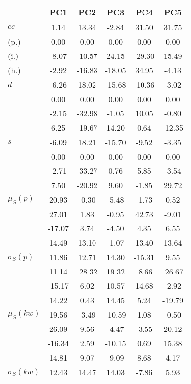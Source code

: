 \begin{table}[h!]
\begin{center}
\begin{tabular}{| l | c | c | c | c | c |}\hline
 & PC1 & PC2 & PC3 & PC4 & PC5 \\\hline
$cc$ & 1.14  & 13.34  & -2.84  & 31.50  & 31.75 \\\hline
(p.) & 0.00  & 0.00  & 0.00  & 0.00  & 0.00 \\\hline
(i.) & -8.07  & -10.57  & 24.15  & -29.30  & 15.49 \\\hline
(h.) & -2.92  & -16.83  & -18.05  & 34.95  & -4.13 \\\hline
$d$ & -6.26  & 18.02  & -15.68  & -10.36  & -3.02 \\\hline
 & 0.00  & 0.00  & 0.00  & 0.00  & 0.00 \\\hline
 & -2.15  & -32.98  & -1.05  & 10.05  & -0.80 \\\hline
 & 6.25  & -19.67  & 14.20  & 0.64  & -12.35 \\\hline
$s$ & -6.09  & 18.21  & -15.70  & -9.52  & -3.35 \\\hline
 & 0.00  & 0.00  & 0.00  & 0.00  & 0.00 \\\hline
 & -2.71  & -33.27  & 0.76  & 5.85  & -3.54 \\\hline
 & 7.50  & -20.92  & 9.60  & -1.85  & 29.72 \\\hline
$\mu_S(p)$ & 20.93  & -0.30  & -5.48  & -1.73  & 0.52 \\\hline
 & 27.01  & 1.83  & -0.95  & 42.73  & -9.01 \\\hline
 & -17.07  & 3.74  & -4.50  & 4.35  & 6.55 \\\hline
 & 14.49  & 13.10  & -1.07  & 13.40  & 13.64 \\\hline
$\sigma_S(p)$ & 11.86  & 12.71  & 14.30  & -15.31  & 9.55 \\\hline
 & 11.14  & -28.32  & 19.32  & -8.66  & -26.67 \\\hline
 & -15.17  & 6.02  & 10.57  & 14.68  & -2.92 \\\hline
 & 14.22  & 0.43  & 14.45  & 5.24  & -19.79 \\\hline
$\mu_S(kw)$ & 19.56  & -3.49  & -10.59  & 1.08  & -0.50 \\\hline
 & 26.09  & 9.56  & -4.47  & -3.55  & 20.12 \\\hline
 & -16.34  & 2.59  & -10.15  & 0.69  & 15.38 \\\hline
 & 14.81  & 9.07  & -9.09  & 8.68  & 4.17 \\\hline
$\sigma_S(kw)$ & 12.43  & 14.47  & 14.03  & -7.86  & 5.93 \\\hline

\end{tabular}
\end{center}
\end{table}

